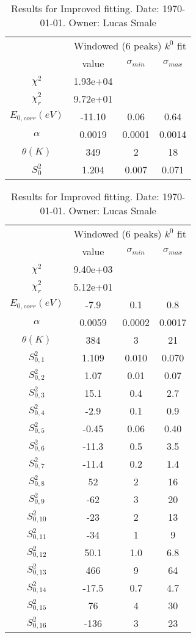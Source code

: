 \documentclass{article}
\begin{document}
\begin{landscape}
\begin{table}[ht]
\centering
\begin{tabular}{c||c|c|c}
\hline
&\multicolumn{3}{|c}{Windowed (6 peaks) $k^{0}$ fit}\\
& value & $\sigma_{min}$ & $\sigma_{max}$\\
\hline
$\chi^2$   & 1.93e+04 & & \\
$\chi^2_r$ & 9.72e+01 & & \\
\hline
$E_{0,corr} (eV)$& -11.10 & 0.06 & 0.64 \\
$\alpha $       & 0.0019 & 0.0001 & 0.0014 \\
$\theta (K) $   & 349 & 2 & 18 \\
$S^2_{0}$& 1.204 & 0.007 & 0.071 \\
\hline
    \end{tabular}
    \caption{Results for Improved fitting. Date: \today. Owner: Lucas Smale}
\end{table}
\begin{table}[ht]
\centering
\begin{tabular}{c||c|c|c}
\hline
&\multicolumn{3}{|c}{Windowed (6 peaks) $k^{0}$ fit}\\
& value & $\sigma_{min}$ & $\sigma_{max}$\\
\hline
$\chi^2$   & 9.40e+03 & & \\
$\chi^2_r$ & 5.12e+01 & & \\
\hline
$E_{0,corr} (eV)$& -7.9 & 0.1 & 0.8 \\
$\alpha $       & 0.0059 & 0.0002 & 0.0017 \\
$\theta (K) $   & 384 & 3 & 21 \\
$S^2_{0,1}$& 1.109 & 0.010 & 0.070 \\
$S^2_{0,2}$& 1.07 & 0.01 & 0.07 \\
$S^2_{0,3}$& 15.1 & 0.4 & 2.7 \\
$S^2_{0,4}$& -2.9 & 0.1 & 0.9 \\
$S^2_{0,5}$& -0.45 & 0.06 & 0.40 \\
$S^2_{0,6}$& -11.3 & 0.5 & 3.5 \\
$S^2_{0,7}$& -11.4 & 0.2 & 1.4 \\
$S^2_{0,8}$& 52 & 2 & 16 \\
$S^2_{0,9}$& -62 & 3 & 20 \\
$S^2_{0,10}$& -23 & 2 & 13 \\
$S^2_{0,11}$& -34 & 1 & 9 \\
$S^2_{0,12}$& 50.1 & 1.0 & 6.8 \\
$S^2_{0,13}$& 466 & 9 & 64 \\
$S^2_{0,14}$& -17.5 & 0.7 & 4.7 \\
$S^2_{0,15}$& 76 & 4 & 30 \\
$S^2_{0,16}$& -136 & 3 & 23 \\
\hline
    \end{tabular}
    \caption{Results for Improved fitting. Date: \today. Owner: Lucas Smale}
\end{table}
\end{landscape}
\end{document}
